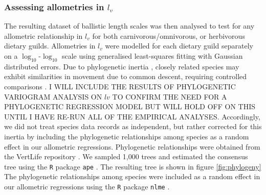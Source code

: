 \documentclass[12pt]{article}
\begin{document}
\subsubsection*{Assessing allometries in $l_v$}

The resulting dataset of ballistic length scales was then analysed to test for any allometric relationship in $l_v$ for both carnivorous/omnivorous, or herbivorous dietary guilds. Allometries in $l_v$ were modelled for each dietary guild separately on a $\log_{10}$-$\log_{10}$ scale using generalised least-squares fitting with Gaussian distributed errors. Due to phylogenetic inertia \cite{Hansen:2005cg}, closely related species may exhibit similarities in movement due to common descent, requiring controlled comparisons \cite{Harvey:1991uo}. I WILL INCLUDE THE RESULTS OF PHYLOGENETIC VARIOGRAM ANALYSIS ON $lv$ TO CONFIRM THE NEED FOR A PHYLOGENETIC REGRESSION MODEL BUT WILL HOLD OFF ON THIS UNTIL I HAVE RE-RUN ALL OF THE EMPIRICAL ANALYSES. Accordingly, we did not treat species data records as independent, but rather corrected for this inertia by including the phylogenetic relationships among species as a random effect in our allometric regressions. Phylogenetic relationships were obtained from the VertLife repository \cite{Upham:2019}. We sampled 1,000 trees and estimated the consensus tree using the \texttt{R} package \texttt{ape} \cite{ape}. The resulting tree is shown in figure \ref{fig:phylogeny} The phylogenetic relationships among species were included as a random effect in our allometric regressions using the \texttt{R} package \texttt{nlme} \cite{Pinheiro:2018}.
\end{document}
